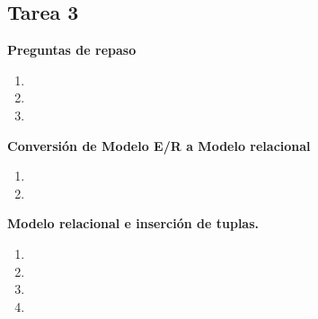 \documentclass{report}
\begin{document}
	
	
	\begin{center}
		\section*{\LARGE{Tarea 3}}
	\end{center}

    \begin{center}
        \LARGE{\textbf{Preguntas de repaso}}\vspace{.3cm}
    \end{center}
    \normalsize
    \begin{enumerate}%
        \item 
        \item 
        \item 
    \end{enumerate}

    \begin{center}
        \LARGE{\textbf{Conversión de Modelo E/R a Modelo relacional  }}\vspace{.3cm}
    \end{center}
    \normalsize
    \begin{enumerate}[label=\alph*.]
        \item 
        \item 
    \end{enumerate}

    \begin{center}
        \LARGE{\textbf{Modelo relacional e inserción de tuplas.}}\vspace{.3cm}
    \end{center}
    \normalsize
    
    \begin{enumerate}[label=\alph*.]
        \item 
        \item 
        \item 
        \item 
    \end{enumerate}
\end{document}

